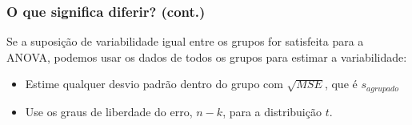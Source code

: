 
\begin{frame}
\frametitle{O que significa diferir? (cont.)}
\justifying
Se a suposição de variabilidade igual entre os grupos for satisfeita para a ANOVA, podemos usar os dados de todos os grupos para estimar a variabilidade:
 
\begin{itemize}
\justifying
\item Estime qualquer desvio padrão dentro do grupo com $ \sqrt {MSE} $, que é $s_{agrupado}$
\justifying
\item Use os graus de liberdade do erro, $n - k$, para a distribuição $t$.

\end{itemize}
\justifying
{}

\end{frame}



